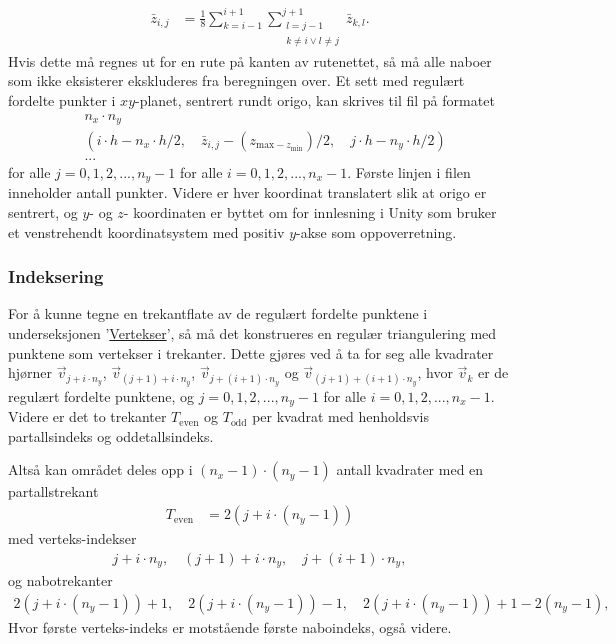 \documentclass[norsk, doc, 12pt, a4paper]{apa7}  %
\begin{document}
\begin{align*}
	\bar{z}_{i,j} &= \frac{1}{8}\sum_{k=i-1}^{i+1}\sum_{\substack{l=j-1 \\ k\neq i \lor l\neq j}}^{j+1} \bar{z}_{k,l}.
\end{align*}
Hvis dette må regnes ut for en rute på kanten av rutenettet, så må alle naboer som ikke eksisterer ekskluderes fra beregningen over.
Et sett med regulært fordelte punkter i \(xy\)-planet, sentrert rundt origo, kan skrives til fil på formatet
\begin{align*}
	&n_{x}\cdot n_{y} \\
	&(i\cdot h - n_{x}\cdot h/2,\quad \bar{z}_{i,j} - (z_{\text{max} - z_{\text{min}}})/2,\quad j\cdot h - n_{y}\cdot h/2) \\
	&...
\end{align*}
for alle \(j=0,1,2,...,n_{y}-1\) for alle \(i=0,1,2,...,n_{x}-1\). Første linjen i filen inneholder antall punkter. Videre er hver koordinat translatert slik at origo er sentrert, og \(y\)- og \(z\)- koordinaten er byttet om for innlesning i Unity \parencite{UnityEngine2023} som bruker et venstrehendt koordinatsystem med positiv \(y\)-akse som oppoverretning.

\subsubsection{Indeksering}
For å kunne tegne en trekantflate av de regulært fordelte punktene i underseksjonen '\hyperref[M:1:1]{Vertekser}', så må det konstrueres en regulær triangulering med punktene som vertekser i trekanter. Dette gjøres ved å ta for seg alle kvadrater hjørner \(\vec{v}_{j + i\cdot n_{y}}\), \(\vec{v}_{(j+1) + i\cdot n_{y}}\), \(\vec{v}_{j + (i+1)\cdot n_{y}}\) og \(\vec{v}_{(j+1) + (i+1)\cdot n_{y}}\), hvor \(\vec{v}_{k}\) er de regulært fordelte punktene, og \(j=0,1,2,...,n_{y}-1\) for alle \(i=0,1,2,...,n_{x}-1\). Videre er det to trekanter \(T_{\text{even}}\) og \(T_{\text{odd}}\) per kvadrat med henholdsvis partallsindeks og oddetallsindeks.

Altså kan området deles opp i \((n_{x}-1)\cdot (n_{y}-1)\) antall kvadrater med en partallstrekant
\begin{align*}
 	T_{\text{even}} &= 2(j + i\cdot (n_{y}-1))
\end{align*} 
med verteks-indekser
\begin{align*}
	j + i\cdot n_{y}, \quad (j+1) + i\cdot n_{y}, \quad j + (i+1)\cdot n_{y},
\end{align*}
og nabotrekanter
\begin{align*}
	2(j + i\cdot (n_{y}-1)) + 1, \quad 2(j + i\cdot (n_{y}-1)) - 1, \quad  2(j + i\cdot (n_{y}-1)) + 1 - 2(n_{y} - 1),
\end{align*}
Hvor første verteks-indeks er motstående første naboindeks, også videre.
\end{document}
